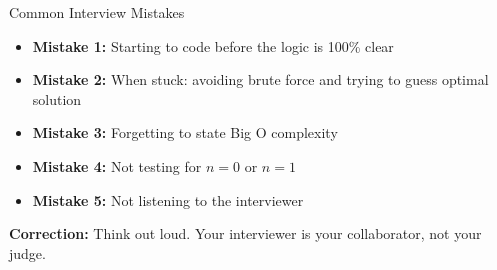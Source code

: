 \begin{frame}{Common Interview Mistakes}
  \begin{itemize}
    \item \textbf{Mistake 1:} Starting to code before the logic is 100\% clear 
    \item \textbf{Mistake 2:} When stuck: avoiding brute force and trying to guess optimal solution 
    \item \textbf{Mistake 3:} Forgetting to state Big O complexity 
    \item \textbf{Mistake 4:} Not testing for $n=0$ or $n=1$ 
    \item \textbf{Mistake 5:} Not listening to the interviewer 
  \end{itemize}
  \vspace{0.3cm}
  \textbf{Correction:} Think out loud. Your interviewer is your collaborator, not your judge.
\end{frame}

